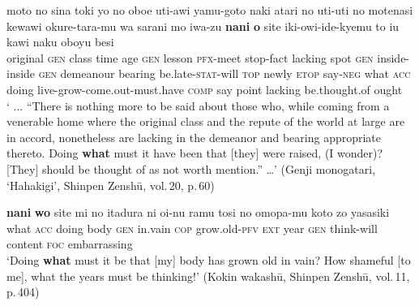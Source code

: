 \documentclass[output=paper]{LSP/langsci}
\begin{document}
\begin{exe}
\ex%
\label{07-fr-ex:46}
\gll moto no sina toki yo no oboe uti-awi yamu-goto naki atari no uti-uti no motenasi kewawi okure-tara-mu wa sarani mo iwa-zu \textbf{nani} \textbf{o} site iki-owi-ide-kyemu to iu kawi naku oboyu besi\\
original \textsc{gen} class time age \textsc{gen} lesson \textsc{pfx}{-meet} stop-fact lacking spot \textsc{gen} inside-inside \textsc{gen} demeanour bearing be.late-\textsc{stat}-will \textsc{top} newly \textsc{etop} say-\textsc{neg}  what \textsc{acc}  doing live-grow-come.out-must.have \textsc{comp} say point lacking be.thought.of ought\\
\glt ‘ ... “There is nothing more to be said about those who, while coming from a venerable home where the original class and the repute of the world at large are in accord, nonetheless are lacking in the demeanor and bearing appropriate thereto. Doing \textbf{what} must it have been that [they] were raised, (I wonder)? [They] should be thought of as not worth mention.” …’  (Genji monogatari, ‘Hahakigi’, Shinpen Zenshū, vol.\,20, p.\,60)
\end{exe}

\begin{exe}
\ex%
\label{07-fr-ex:47}
\gll \textbf{nani} \textbf{wo} site mi no itadura ni oi-nu ramu tosi no omopa-mu koto zo yasasiki\\
 what \textsc{acc}  doing body \textsc{gen} in.vain \textsc{cop} grow.old-\textsc{pfv} \textsc{ext} year \textsc{gen} think-will content \textsc{foc} embarrassing\\
\glt ‘Doing \textbf{what} must it be that [my] body has grown old in vain? How shameful [to me], what the years must be thinking!’  (Kokin wakashū, Shinpen Zenshū, vol.\,11, p.\,404)\\
\end{exe}
\end{document}
